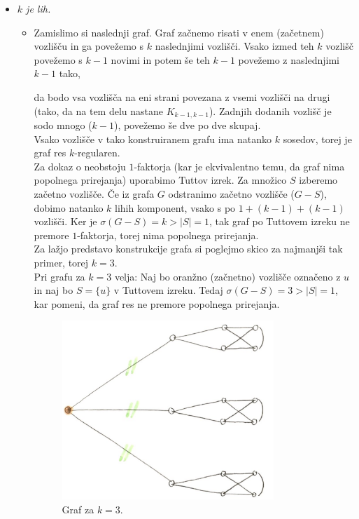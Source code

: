 \documentclass[a4paper,11pt]{article}
\begin{document}
\begin{itemize}
\begin{itemize}[label={}]
    \end{itemize}

\item \textit{$k$ je lih.}
    \begin{itemize}[label={}]
        \item Zamislimo si naslednji graf. Graf začnemo risati v enem (začetnem) vozlišču in ga povežemo s $k$ naslednjimi vozlišči. Vsako izmed teh $k$ vozlišč povežemo s $k - 1$ novimi in potem še teh $k - 1$ povežemo z naslednjimi $k - 1$ tako, 
        
                da bodo vsa vozlišča na eni strani povezana z vsemi vozlišči na drugi (tako, da na tem delu nastane $K_{k-1, k-1}$). 
                Zadnjih dodanih vozlišč je sodo mnogo ($k - 1$), povežemo še dve po dve skupaj.
                \\
                Vsako vozlišče v tako konstruiranem grafu ima natanko $k$ sosedov, torej je graf res $k$-regularen.
                \\
                Za dokaz o neobstoju $1$-faktorja (kar je ekvivalentno temu, da graf nima popolnega prirejanja) uporabimo Tuttov izrek. Za množico $S$ izberemo začetno vozlišče. Če iz grafa $G$ odstranimo začetno vozlišče ($G - S$), dobimo natanko $k$ lihih komponent, vsako s po $1 + (k - 1) + (k - 1)$ vozlišči. Ker je $\sigma (G - S) = k > |S| = 1$, tak graf po Tuttovem izreku ne premore $1$-faktorja, torej nima popolnega prirejanja.
                \\
                Za lažjo predstavo konstrukcije grafa si poglejmo skico za najmanjši tak primer, torej $k = 3$.
                \\
                Pri grafu za $k = 3$ velja: Naj bo oranžno (začnetno) vozlišče označeno z $u$ in naj bo $S = \{ u\}$ v Tuttovem izreku. 
                Tedaj $\sigma(G - S) = 3 > |S| = 1$, kar pomeni, da graf res ne premore popolnega prirejanja.
                \begin{figure}[ht!]
                    \centering
                    \includegraphics[width=80mm]{k_lih.png}
                    \caption{Graf za $k = 3$.}
                \end{figure}
    \end{itemize}
\end{itemize}
\end{document}
